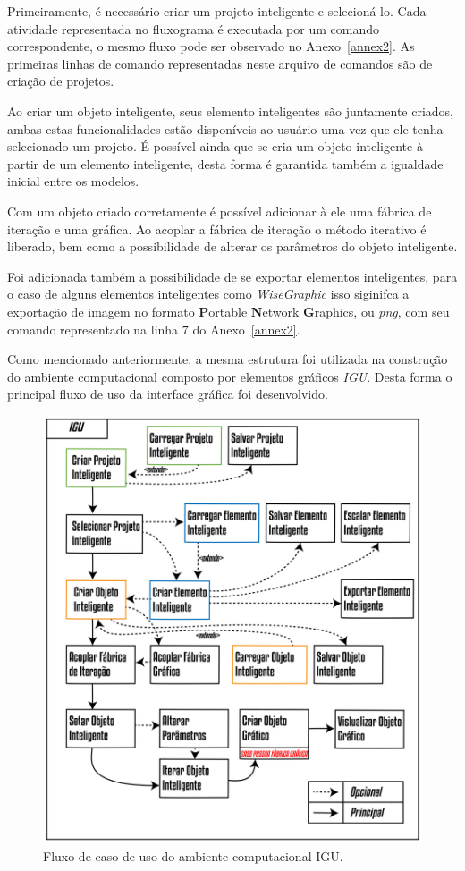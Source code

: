 Primeiramente, é necessário criar um projeto inteligente e selecioná-lo. Cada atividade representada no fluxograma é executada por um comando correspondente, o mesmo fluxo pode ser observado no Anexo~\ref{annex2}. As primeiras linhas de comando representadas neste arquivo de comandos são de criação de projetos.

Ao criar um objeto inteligente, seus elemento inteligentes são juntamente criados, ambas estas funcionalidades estão disponíveis ao usuário uma vez que ele tenha selecionado um projeto. É possível ainda que se cria um objeto inteligente à partir de um elemento inteligente, desta forma é garantida também a igualdade inicial entre os modelos.

Com um objeto criado corretamente é possível adicionar à ele uma fábrica de iteração e uma gráfica. Ao acoplar a fábrica de iteração o método iterativo é liberado, bem como a possibilidade de alterar os parâmetros do objeto inteligente.

Foi adicionada também a possibilidade de se exportar elementos inteligentes, para o caso de alguns elementos inteligentes como \textit{WiseGraphic} isso siginifca a exportação de imagem no formato \textbf{P}ortable \textbf{N}etwork \textbf{G}raphics, ou \textit{png}, com seu comando representado na linha $7$ do Anexo~\ref{annex2}.

Como mencionado anteriormente, a mesma estrutura foi utilizada na construção do ambiente computacional composto por elementos gráficos \textit{IGU}. Desta forma o principal fluxo de uso da interface gráfica foi desenvolvido.

\begin{figure}[!htbp]
	\centering
	\includegraphics[width=\linewidth]{Figures/CasoDeUso2@16x.png}
	\caption{Fluxo de caso de uso do ambiente computacional IGU.}
	\label{fig:caso_uso2}
\end{figure}

